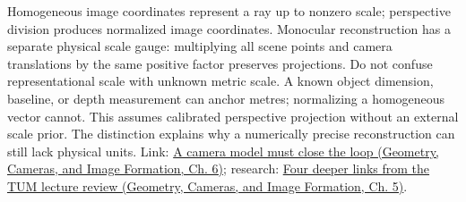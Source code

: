 Homogeneous image coordinates represent a ray up to nonzero scale; perspective division produces normalized image coordinates. Monocular reconstruction has a separate physical scale gauge: multiplying all scene points and camera translations by the same positive factor preserves projections. Do not confuse representational scale with unknown metric scale. A known object dimension, baseline, or depth measurement can anchor metres; normalizing a homogeneous vector cannot. This assumes calibrated perspective projection without an external scale prior. The distinction explains why a numerically precise reconstruction can still lack physical units. Link: \href{../03-Geometry-Cameras-and-Image-Formation/main.pdf\#nameddest=02-foundations-ii-ch037-a-camera-model-must-close-the-loop}{A camera model must close the loop (Geometry, Cameras, and Image Formation, Ch. 6)}; research: \href{../03-Geometry-Cameras-and-Image-Formation/main.pdf\#nameddest=02-foundations-ii-ch036-four-deeper-links-from-the-tum-lecture-review}{Four deeper links from the TUM lecture review (Geometry, Cameras, and Image Formation, Ch. 5)}.
